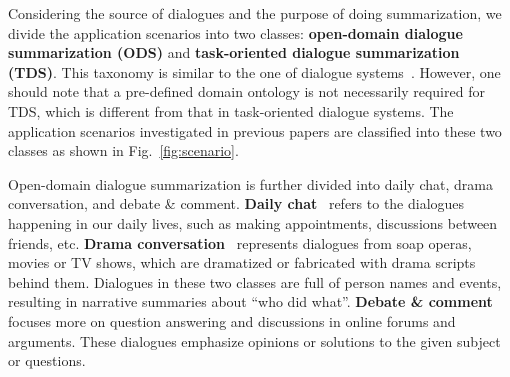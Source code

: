 Considering the source of dialogues and the purpose of doing summarization,
we divide the application scenarios into two classes: \textbf{open-domain dialogue summarization (ODS)} and \textbf{task-oriented dialogue summarization (TDS)}. This taxonomy is similar to the one of dialogue systems~\cite{chen2017survey}. 
However, one should note that a pre-defined domain ontology is 
not necessarily required for TDS, which is different from that in 
task-oriented dialogue systems.
The application scenarios investigated in previous papers 
are classified into these two classes as shown in Fig.~\ref{fig:scenario}.

Open-domain dialogue summarization is further divided into daily chat, 
drama conversation, and debate \& comment. 
\textbf{Daily chat}~\cite{gliwa2019samsum,chen2021dialsumm} refers to the dialogues happening in our daily lives, 
such as making appointments, discussions between friends, etc. 
\textbf{Drama conversation}~\cite{rameshkumar2020storytelling,zhu2021mediasum,malykh2020sumtitles,chen2021summscreen} represents dialogues from soap operas, 
movies or TV shows, which are dramatized or fabricated with drama scripts 
behind them. Dialogues in these two classes are full of person names 
and events, resulting in narrative summaries about ``who did what''.
\textbf{Debate \& comment}~\cite{misra2015using,fabbri2021convosumm,chowdhury2019cqasumm} focuses more on question answering and 
discussions in online forums and arguments. These dialogues emphasize opinions or solutions to the given subject or questions.

